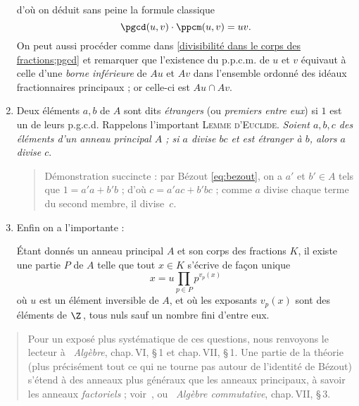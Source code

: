 \documentclass[11pt, useosf,
  title in boldface,
  theorem in new line,
  theorem numbering = section,
  number theorems separately,
]{simplivre}
\begin{document}
\begin{enumerate}[itemsep=.3\baselineskip]
\begin{equation}
        \end{equation}
        d'où on déduit sans peine la formule classique
        \begin{equation}
            \pgcd(u,v) \cdot \ppcm(u,v) = uv.
        \end{equation}
        On peut aussi procéder comme dans \ref{divisibilité dans le corps des fractions;pgcd} et remarquer que l'existence du p.p.c.m. de \( u \) et \( v \) équivaut à celle d'une \emph{borne inférieure} de \( Au \) et \( Av \) dans l'ensemble ordonné des idéaux fractionnaires principaux ; or celle-ci est \( Au \cap Av \).
        \item Deux éléments \( a,b \) de \( A \) sont dits \emph{étrangers} (ou \emph{premiers entre eux}) si \( 1 \) est un de leurs p.g.c.d. Rappelons l'important \textsc{Lemme d'Euclide}. \emph{Soient \( a,b,c \) des éléments d'un anneau principal \( A \) ; si \( a \) divise \( bc \) et est étranger à \( b \), alors \( a \) divise \( c \)}.
        \begin{quote}
            Démonstration succincte :
            par Bézout \eqref{eq:bezout}, on a \( a' \) et \( b' \in A \) tels que \( 1 = a'a + b'b \) ; d'où \( c = a'a c + b'b c \) ; comme \( a \) divise chaque terme du second membre, il divise~\( c \).
        \end{quote}
        \item Enfin on a l'importante  :
        \begin{theorem*}
            Étant donnés un anneau principal \( A \) et son corps des fractions \( K \), il existe une partie \( P \) de \( A \) telle que tout \( x \in K \) s'écrive de façon unique
            \begin{equation}
                x = u \prod_{p \in P} p^{v_p(x)}
            \end{equation}
            où \( u \) est un élément inversible de \( A \), et où les exposants \( v_p(x) \) sont des éléments de \( \Z \)\,, tous nuls sauf un nombre fini d'entre eux.
        \end{theorem*}
    \end{enumerate}

    \begin{quote}
        Pour un exposé plus systématique de ces questions, nous renvoyons le lecteur à \cite{bourbaki1}~\emph{Algèbre}, chap.\,VI, \S\,1 et chap.\,VII, \S\,1. Une partie de la théorie (plus précisément tout ce qui ne tourne pas autour de l'identité de Bézout) s'étend à des anneaux plus généraux que les anneaux principaux, à savoir les anneaux \emph{factoriels} ; voir~\cite{samuel1964}, ou \cite{bourbaki2}~\emph{Algèbre commutative}, chap.\,VII, \S\,3.
    \end{quote}
\end{document}
